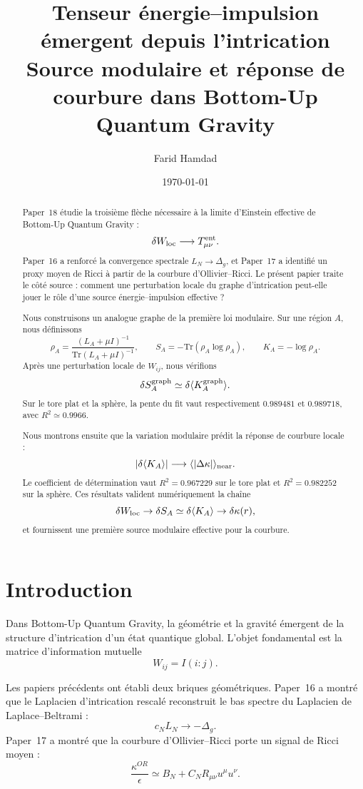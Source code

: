 \documentclass[11pt,a4paper]{article}
\title{
\textbf{Tenseur énergie--impulsion émergent depuis l'intrication}\\
\large Source modulaire et réponse de courbure dans Bottom-Up Quantum Gravity
}
\author{Farid Hamdad}
\date{\today}
\begin{document}
\maketitle

\begin{abstract}
Paper~18 étudie la troisième flèche nécessaire à la limite d'Einstein
effective de Bottom-Up Quantum Gravity :
\[
\delta W_{\rm loc}
\longrightarrow
T_{\mu\nu}^{\rm ent}.
\]
Paper~16 a renforcé la convergence spectrale
\(L_N\to\Delta_g\), et Paper~17 a identifié un proxy moyen de Ricci à partir
de la courbure d'Ollivier--Ricci. Le présent papier traite le côté source :
comment une perturbation locale du graphe d'intrication peut-elle jouer le
rôle d'une source énergie--impulsion effective ?

Nous construisons un analogue graphe de la première loi modulaire. Sur une
région \(A\), nous définissons
\[
\rho_A=
\frac{(L_A+\mu I)^{-1}}{\mathrm{Tr}(L_A+\mu I)^{-1}},
\qquad
S_A=-\mathrm{Tr}(\rho_A\log\rho_A),
\qquad
K_A=-\log\rho_A.
\]
Après une perturbation locale de \(W_{ij}\), nous vérifions
\[
\delta S_A^{\rm graph}
\simeq
\delta\langle K_A^{\rm graph}\rangle.
\]
Sur le tore plat et la sphère, la pente du fit vaut respectivement
\(0.989481\) et \(0.989718\), avec \(R^2\simeq0.9966\).

Nous montrons ensuite que la variation modulaire prédit la réponse de
courbure locale :
\[
|\delta\langle K_A\rangle|
\longrightarrow
\langle|\Delta\kappa|\rangle_{\rm near}.
\]
Le coefficient de détermination vaut \(R^2=0.967229\) sur le tore plat et
\(R^2=0.982252\) sur la sphère. Ces résultats valident numériquement la chaîne
\[
\delta W_{\rm loc}
\to
\delta S_A
\simeq
\delta\langle K_A\rangle
\to
\delta\kappa(r),
\]
et fournissent une première source modulaire effective pour la courbure.
\end{abstract}

\tableofcontents

\section{Introduction}

Dans Bottom-Up Quantum Gravity, la géométrie et la gravité émergent de la
structure d'intrication d'un état quantique global. L'objet fondamental est
la matrice d'information mutuelle
\[
W_{ij}=I(i:j).
\]

Les papiers précédents ont établi deux briques géométriques. Paper~16 a
montré que le Laplacien d'intrication rescalé reconstruit le bas spectre du
Laplacien de Laplace--Beltrami :
\[
c_N L_N\to-\Delta_g.
\]
Paper~17 a montré que la courbure d'Ollivier--Ricci porte un signal de Ricci
moyen :
\[
\frac{\kappa^{OR}}{\epsilon}
\simeq
B_N+C_N R_{\mu\nu}u^\mu u^\nu.
\]
\end{document}
